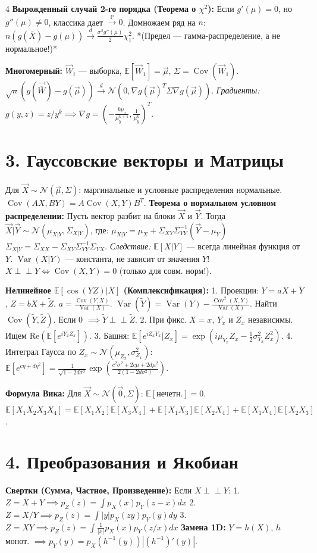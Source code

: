 \documentclass[8pt, a4paper, landscape]{extarticle}
\newcommand{\E}{\mathbb{E}}
\renewcommand{\P}{\mathbb{P}}
\DeclareMathOperator{\Var}{Var}
\DeclareMathOperator{\Cov}{Cov}
\newcommand{\toP}{\xrightarrow{\P}}
\newcommand{\toD}{\xrightarrow{d}}
\newcommand{\N}{\mathcal{N}}
\begin{document}
\begin{multicols*}{4}
\textbf{Вырожденный случай 2-го порядка (Теорема о $\chi^2$):}
Если $g'(\mu)=0$, но $g''(\mu)\ne 0$, классика дает $\toP 0$.
Домножаем ряд на $n$: $n(g(\overline{X}) - g(\mu)) \toD \frac{\sigma^2 g''(\mu)}{2} \chi^2_1$.
*(Предел — гамма-распределение, а не нормальное!)*

\textbf{Многомерный:} $\vec{W}_i$ --- выборка, $\E[\vec{W}_1]\!=\!\vec{\mu}$, $\Sigma \!=\! \Cov(\vec{W}_1)$.
$\sqrt{n}(g(\vec{\overline{W}}) - g(\vec{\mu})) \toD \N(0, \nabla g(\vec{\mu})^T \Sigma \nabla g(\vec{\mu}))$.
\textit{Градиенты:} $g(y,z) = z/y^k \implies \nabla g = \left(-\frac{k\mu_z}{\mu_y^{k+1}}, \frac{1}{\mu_y^k}\right)^T$.

\section*{3. Гауссовские векторы и Матрицы}
Для $\vec{X} \sim \N(\vec{\mu}, \Sigma)$: маргинальные и условные распределения нормальные. $\Cov(AX, BY) = A\Cov(X,Y)B^T$.
\textbf{Теорема о нормальном условном распределении:}
Пусть вектор разбит на блоки $\vec{X}$ и $\vec{Y}$. Тогда $\vec{X}|\vec{Y} \sim \N(\mu_{X|Y}, \Sigma_{X|Y})$, где:
$\mu_{X|Y} = \mu_X + \Sigma_{XY}\Sigma_{YY}^{-1}(\vec{Y} - \mu_Y)$
$\Sigma_{X|Y} = \Sigma_{XX} - \Sigma_{XY}\Sigma_{YY}^{-1}\Sigma_{YX}$.
\textit{Следствие:} $\E[X|Y]$ — всегда линейная функция от $Y$. $\Var(X|Y)$ — константа, не зависит от значения $Y$!
$X \perp\!\!\perp Y \iff \Cov(X,Y) = 0$ (только для совм. норм!).

\textbf{Нелинейное $\E[\cos(YZ)|X]$ (Комплексификация):}
1. Проекции: $Y \!=\! aX\!+\!\tilde{Y}$, $Z \!=\! bX\!+\!\tilde{Z}$. $a \!=\! \frac{\Cov(Y,X)}{\Var(X)}$. 
$\Var(\tilde{Y}) \!=\! \Var(Y) \!-\! \frac{\Cov^2(X,Y)}{\Var(X)}$. Найти $\Cov(\tilde{Y},\tilde{Z})$. Если 0 $\implies \tilde{Y} \perp\!\!\perp \tilde{Z}$.
2. При фикс. $X=x$, $Y_x$ и $Z_x$ независимы. Ищем $\text{Re}(\E[e^{iY_x Z_x}])$.
3. Башня: $\E[e^{i Z_x Y_x}|Z_x] = \exp(i\mu_{Y_x} Z_x - \frac{1}{2}\sigma_{Y_x}^2 Z_x^2)$.
4. Интеграл Гаусса по $Z_x \sim \N(\mu_{Z_x}, \sigma_{Z_x}^2)$:
$\E[e^{c\eta + d\eta^2}] = \frac{1}{\sqrt{1-2d\sigma^2}}\exp\left( \frac{c^2\sigma^2+2c\mu+2d\mu^2}{2(1-2d\sigma^2)} \right)$.

\textbf{Формула Вика:} Для $\vec{X} \sim \N(\vec{0}, \Sigma)$: $\E[\text{нечетн.}]=0$.
$\E[X_1 X_2 X_3 X_4] = \E[X_1 X_2]\E[X_3 X_4] + \E[X_1 X_3]\E[X_2 X_4] + \E[X_1 X_4]\E[X_2 X_3]$.

\section*{4. Преобразования и Якобиан}
\textbf{Свертки (Сумма, Частное, Произведение):} Если $X \perp\!\!\perp Y$:
1. $Z = X+Y \implies p_Z(z) = \int p_X(x)p_Y(z-x)dx$
2. $Z = X/Y \implies p_Z(z) = \int |y| p_{X}(zy) p_Y(y)dy$
3. $Z = XY \implies p_Z(z) = \int \frac{1}{|x|} p_X(x) p_Y(z/x)dx$
\textbf{Замена 1D:} $Y \!=\! h(X)$, $h$ монот. $\implies p_Y(y) \!=\! p_X(h^{-1}(y))|(h^{-1})'(y)|$.


\end{multicols*}
\end{document}
